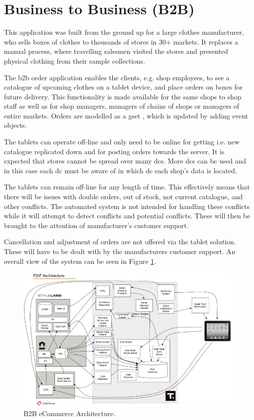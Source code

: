 \section{Business to Business (B2B)}
This application was built from the ground up for a large clothes manufacturer, who sells boxes of clothes to thousands of stores in 30+ markets. It replaces a manual process, where travelling salesmen visited the stores and presented physical clothing from their sample collections.

The \gls{b2b} order application enables the clients, e.g. shop employees, to see a catalogue of upcoming clothes on a tablet device, and place orders on boxes for future delivery. This functionality is made available for the same shops to shop staff as well as for shop managers, managers of chains of shops or managers of entire markets. Orders are modelled as a \gls{gset} \cite{shapiro11comprehensive}, which is updated by adding event objects.

The tablets can operate off-line and only need to be online for getting i.e. new catalogue replicated down and for posting orders towards the server. It is expected that stores cannot be spread over many \glspl{dc}. More \glspl{dc} can be used and in this case each \gls{dc} must be aware of in which \gls{dc} each shop's data is located.

The tablets can remain off-line for any length of time. This effectively means that there will be issues with double orders, out of stock, not current catalogue, and other conflicts. The automated system is not intended for handling these conflicts while it will attempt to detect conflicts and potential conflicts. These will then be brought to the attention of manufacturer's customer support.

Cancellation and adjustment of orders are not offered via the tablet solution. These will have to be dealt with by the manufacturers customer support. An overall view of the system can be seen in Figure \ref{fig:b2b_architecture}.
\begin{figure}[ht!]
	\centering
	\includegraphics[width=1\textwidth]{figures/b2b.png}
	
	\caption{B2B eCommerce Architecture.}
	\label{fig:b2b_architecture}
\end{figure}
